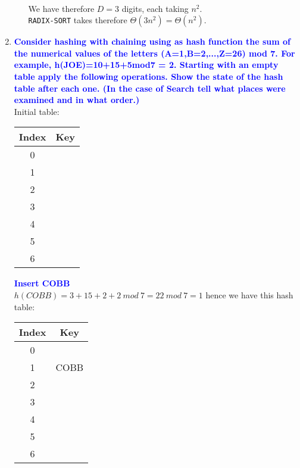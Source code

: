 \documentclass[11pt]{article}
\begin{document}
\begin{enumerate}
\begin{enumerate}
        \\ We have therefore $D = 3$ digits, each taking $n^2$.
        \\ {\tt RADIX-SORT} takes therefore $\Theta(3n^2) = \Theta(n^2)$.
    \end{enumerate}
\item \textbf{\textcolor{blue}{Consider hashing with chaining using as hash function 
the sum of the numerical values of the letters (A=1,B=2,...,Z=26) mod 7. 
For example, h(JOE)=10+15+5mod7 = 2.  Starting with an empty table apply the following 
operations. Show the state of the hash table after each one. (In the
case of Search tell what places were examined and in what order.)}}
    \\ Initial table:
    \begin{center}
    \begin{tabular}{ | c | c | } 
        \hline
        Index & Key \\ 
        \hline\hline
        0 & \\
        \hline
        1 & \\
        \hline
        2 & \\
        \hline
        3 & \\
        \hline
        4 & \\
        \hline
        5 & \\
        \hline
        6 & \\
        \hline
    \end{tabular}
    \end{center}
\textbf{\textcolor{blue}{Insert COBB}}
    \\ $h(COBB)=3+15+2+2\ mod\ 7 = 22\ mod\ 7 = 1$ hence we have this hash table:
    \begin{center}
    \begin{tabular}{ | c | c | } 
        \hline
        Index & Key \\ 
        \hline\hline
        0 & \\
        \hline
        1 & COBB\\
        \hline
        2 & \\
        \hline
        3 & \\
        \hline
        4 & \\
        \hline
        5 & \\
        \hline
        6 & \\
        \hline
    \end{tabular}
    \end{center}

\end{enumerate}
\end{document}
